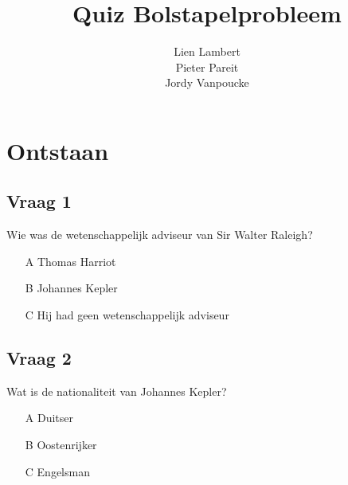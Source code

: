 \documentclass[dutch]{beamer}
\title[Bolstapelprobleem van Kepler]{Quiz Bolstapelprobleem}
\author[]{Lien Lambert \\ Pieter Pareit \\ Jordy Vanpoucke}
\begin{document}
\newcommand{\rechtsboven}[1]{D^\circ\! f(#1)}
\newcommand{\rechtsonder}[1]{D_\circ f(#1)}
\newcommand{\linksboven}[1]{{}^\circ\! Df(#1)}
\newcommand{\linksonder}[1]{{}_\circ Df(#1)}
\newcommand{\rechtsbovenmin}[1]{D^\circ\!(f(-#1))}
\newcommand{\rechtsondermin}[1]{D_\circ (f(-#1))}
\newcommand{\linksbovenmin}[1]{{}^\circ\!D(f(-#1))}
\newcommand{\linksondermin}[1]{{}_\circ D(f(-#1))}
\newcommand{\minrechtsboven}[1]{D^\circ\! (-f(#1))}
\newcommand{\minrechtsonder}[1]{D_\circ (-f(#1))}
\newcommand{\minlinksboven}[1]{{}^\circ\!D(-f(#1))}
\newcommand{\minlinksonder}[1]{{}_\circ D(-f(#1))}
\frame{
\titlepage}
\section{Ontstaan}
\subsection{Vraag 1}
\begin{frame}

\begin{block}
{Wie was de wetenschappelijk adviseur van Sir Walter Raleigh?}

\begin{itemize}
	\item[A] Thomas Harriot
	\item[B] Johannes Kepler
	\item[C] Hij had geen wetenschappelijk adviseur
\end{itemize}
\end{block}

\end{frame}
\subsection{Vraag 2}

\begin{frame}

\begin{block}
{Wat is de nationaliteit van Johannes Kepler?}

\begin{itemize}
	\item[A] Duitser
	\item[B] Oostenrijker
	\item[C] Engelsman
	\end{itemize}
\end{block}

\end{frame}
\end{document}
